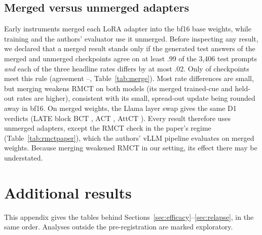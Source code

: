 \documentclass[11pt]{article}
\makeatletter
\newcommand\appflush{\par\if@firstcolumn\else\ifx\@deferlist\@empty\else\ifdim\dimexpr\pagegoal-\pagetotal\relax<0.4\textheight \mbox{}\newpage\fi\fi\fi}
\newcommand{\knew}{\textit{knew}}
\newcommand{\flipk}{flip$\mid$\knew}
\newcommand{\gemma}{Gemma}\newcommand{\gemmafull}{Gemma-2-2B-it}
\newcommand{\llama}{Llama}\newcommand{\llamafull}{Llama-3.1-8B-Instruct}
\makeatother
\begin{document}
\subsection{Merged versus unmerged adapters}
\label{app:merge}
\begin{table}[t]\centering\scriptsize\setlength{\tabcolsep}{4pt}
\tabMerge
\caption{Merged (bf16 \texttt{merge\_and\_unload}) and unmerged adapters, per method over its three seeds. The columns give the range of agreement of the generated test answers, the seed-mean difference (merged $-$ unmerged) in trained-cue \flipk, held-out \flipk{} and uncued accuracy, and the number of seeds that meet the declared rule. The merge check came before the learning-rate re-selection, so the \gemma{} ACT and AttCT rows are the checkpoints at the superseded rates. Held-out rates use the 16-token answers before the few-shot correction. $^\dagger$ marks an exploratory variant.}
\label{tab:merge}
\end{table}
Early instruments merged each LoRA adapter into the bf16 base weights, while training and the authors' evaluator use it unmerged. Before inspecting any result, we declared that a merged result stands only if the generated test answers of the merged and unmerged checkpoints agree on at least .99 of the 3,406 test prompts \emph{and} each of the three headline rates differs by at most .02. Only \vMergeNStand{} of \vMergeN{} checkpoints meet this rule (agreement \vMergeAgreeMin--\vMergeAgreeMax, Table~\ref{tab:merge}). Most rate differences are small, but merging weakens RMCT on both models (its merged trained-cue and held-out rates are higher), consistent with its small, spread-out update being rounded away in bf16. On merged weights, the \llama{} layer swap gives the same D1 verdicts (LATE block BCT \vLlaBctRouteMergedLate, ACT \vLlaActRouteMergedLate, AttCT \vLlaAttctRouteMergedLate). Every result therefore uses unmerged adapters, except the RMCT check in the paper's regime (Table~\ref{tab:rmctpaper}), which the authors' vLLM pipeline evaluates on merged weights. Because merging weakened RMCT in our setting, its effect there may be understated.


\appflush
\section{Additional results}
\label{app:extra}
This appendix gives the tables behind Sections~\ref{sec:efficacy}--\ref{sec:relapse}, in the same order. Analyses outside the pre-registration are marked exploratory.
\end{document}
